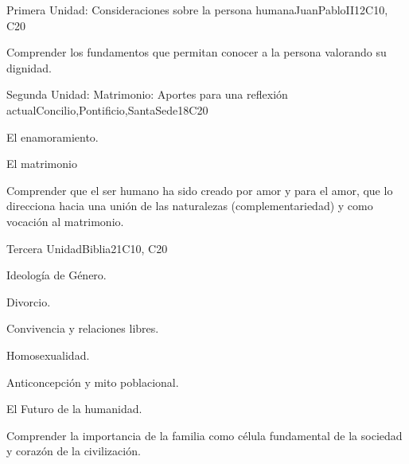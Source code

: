 \begin{syllabus}
\begin{unit}{}{Primera Unidad: Consideraciones sobre la persona humana}{JuanPabloII}{12}{C10, C20}
\begin{learningoutcomes}
	\item Comprender los fundamentos que permitan conocer a la persona valorando su dignidad.
\end{learningoutcomes}
\end{unit}

\begin{unit}{}{Segunda Unidad: Matrimonio: Aportes para una reflexión actual}{Concilio,Pontificio,SantaSede}{18}{C20}
\begin{topics}
	\item El enamoramiento.
    \item El matrimonio	
\end{topics}
\begin{learningoutcomes}
	\item Comprender que el ser humano ha sido creado por amor y para el amor, que lo direcciona hacia una unión de las naturalezas (complementariedad) y como vocación al matrimonio.
\end{learningoutcomes}
\end{unit}

\begin{unit}{}{Tercera Unidad}{Biblia}{21}{C10, C20}
\begin{topics}
	\item Ideología de Género.
	\item Divorcio.
	\item Convivencia y relaciones libres.
	\item Homosexualidad.
	\item Anticoncepción y mito poblacional.
	\item El Futuro de la humanidad.
\end{topics}
\begin{learningoutcomes}
	\item Comprender la importancia de la familia como célula fundamental de la sociedad y corazón de la civilización.
\end{learningoutcomes}
\end{unit}


\end{syllabus}
